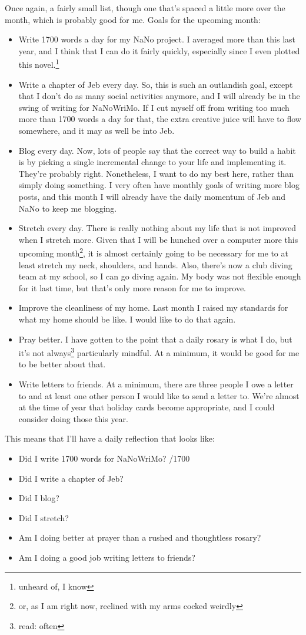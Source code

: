 \documentclass[12pt]{article}[titlepage]
\renewcommand{\,}{\textsuperscript{,}}
\begin{document}
Once again, a fairly small list, though one that's spaced a little more over the month, which is probably good for me.
Goals for the upcoming month:
\begin{itemize}
\item Write 1700 words a day for my NaNo project.
I averaged more than this last year, and I think that I can do it fairly quickly, especially since I even plotted this novel.\footnote{unheard of, I know}
\item Write a chapter of Jeb every day.
So, this is such an outlandish goal, except that I don't do as many social activities anymore, and I will already be in the swing of writing for NaNoWriMo.
If I cut myself off from writing too much more than 1700 words a day for that, the extra creative juice will have to flow somewhere, and it may as well be into Jeb.
\item Blog every day.
Now, lots of people say that the correct way to build a habit is by picking a single incremental change to your life and implementing it.
They're probably right.
Nonetheless, I want to do my best here, rather than simply doing something.
I very often have monthly goals of writing more blog posts, and this month I will already have the daily momentum of Jeb and NaNo to keep me blogging.
\item Stretch every day.
There is really nothing about my life that is not improved when I stretch more.
Given that I will be hunched over a computer more this upcoming month\footnote{or, as I am right now, reclined with my arms cocked weirdly}, it is almost certainly going to be necessary for me to at least stretch my neck, shoulders, and hands.
Also, there's now a club diving team at my school, so I can go diving again.
My body was not flexible enough for it last time, but that's only more reason for me to improve.
\item Improve the cleanliness of my home.
Last month I raised my standards for what my home should be like.
I would like to do that again.
\item Pray better.
I have gotten to the point that a daily rosary is what I do, but it's not always\footnote{read: often} particularly mindful.
At a minimum, it would be good for me to be better about that.
\item Write letters to friends.
At a minimum, there are three people I owe a letter to and at least one other person I would like to send a letter to.
We're almost at the time of year that holiday cards become appropriate, and I could consider doing those this year.
\end{itemize}

This means that I'll have a daily reflection that looks like:
\begin{itemize}
\item Did I write 1700 words for NaNoWriMo? /1700
\item Did I write a chapter of Jeb?
\item Did I blog?
\item Did I stretch?
\item Am I doing better at prayer than a rushed and thoughtless rosary?
\item Am I doing a good job writing letters to friends?
\end{itemize}
\end{document}
